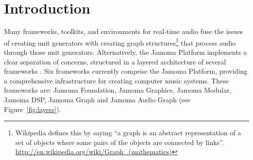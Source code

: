 \documentclass[twoside,a4paper]{article}
\title{\papertitle}
\begin{document}

\maketitle
\sloppy


%
\begin{abstract} %
%
%
Jamoma Audio Graph is a framework for creating graph structures in which unit generators are connected together to process dynamic multi-channel audio in real-time.  
These graph structures are particularly well-suited to spatial audio contexts demanding large numbers of audio channels, such as Higher Order Ambisonics, Wave Field Synthesis and microphone arrays for beamforming.
This framework forms part of the Jamoma layered architecture for interactive systems, with current implementations of Jamoma Audio Graph targeting the Max/MSP, PureData, Ruby, and AudioUnit environments.

\end{abstract} %




%
\section{Introduction} %
%

\label{sec:intro}

Many frameworks, toolkits, and environments for real-time audio fuse the issues of creating unit generators with creating graph structures\footnote{Wikipedia defines this by saying ``a graph is an abstract representation of a set of objects where some pairs of the objects are connected by links''. \url{http://en.wikipedia.org/wiki/Graph_(mathematics)}} that process audio through those unit generators.
Alternatively, the Jamoma Platform implements a clear separation of concerns, structured in a layered architecture of several frameworks \cite{Place:2010}.
Six frameworks currently comprise the Jamoma Platform, providing a comprehensive infrastructure for creating computer music systems. 
These frameworks are: Jamoma Foundation, Jamoma Graphics, Jamoma Modular, Jamoma DSP, Jamoma Graph and Jamoma Audio Graph (see Figure~\ref{fig:layers}).
\end{document}
